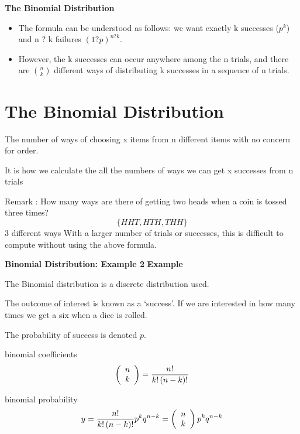 \documentclass[a4paper,12pt]{article}
\begin{document}
\textbf{The Binomial Distribution}


\begin{itemize}
	\item The formula can be understood as follows: we want exactly k successes ($p^k$) and n ? k failures $(1 ? p)^{n ? k}$.
	\item However, the k successes can occur anywhere among the n trials, and there are ${n \choose k}$ different ways of distributing k successes in a sequence of n trials.
\end{itemize}


\newpage
\section{The Binomial Distribution}


The number of ways of choosing x items from n different items with no concern for order.

It is how we calculate the all the numbers of ways we can get x successes from n trials

Remark : 
How many ways are there of getting two heads when a coin is tossed three times?
\[\{HHT,			HTH,			THH\}\]
3 different ways
With a larger number of trials or successes, this is difficult to compute without using the above formula.








\textbf{Binomial Distribution: Example 2}
\textbf{Example}




The Binomial distribution is a discrete distribution used.


The outcome of interest is known as a `success'. If we are
interested in how many times we get a six when a dice is rolled.

The probability of success is denoted $p$.

binomial coefficients
\[
\left( {\begin{array}{*{20}c} n \\ k \\ \end{array}} \right) =
\frac{{n!}}{{k!\left( {n - k} \right)!}} \]


binomial probability
\[y = \frac{{n!}}{{k!\left( {n - k} \right)!}}p^k q^{n - k} = \left( {\begin{array}{*{20}c} n \\ k \\ \end{array}} \right)p^k q^{n -
	k}\]
\end{document}
